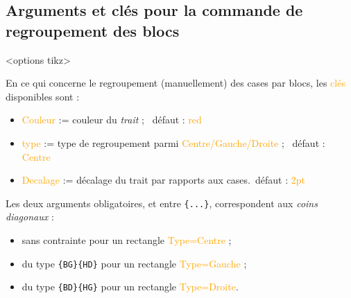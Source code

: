 \documentclass[french,a4paper,11pt]{article}
\newcommand\Cle[1]{{\small\sffamily\textlangle \textcolor{orange}{#1}\textrangle}}
\begin{document}
{{\begin{DemoCode}[]
\begin{TableKarnaugh}[Variables=k/l/m,StyleAlternatif]
\end{TableKarnaugh}
\end{DemoCode}

\pagebreak

\subsection{Arguments et clés pour la commande de regroupement des blocs}

\begin{DemoCode}
\begin{TableKarnaugh}[clés]<options tikz>
\end{TableKarnaugh}
\end{DemoCode}

\begin{tipblock}
En ce qui concerne le regroupement (manuellement) des cases par blocs, les \Cle{clés} disponibles sont :

\begin{itemize}
	\item \Cle{Couleur} := couleur du \textit{trait} ; \hfill~défaut : \Cle{red}
	\item \Cle{type} := type de regroupement parmi \Cle{Centre/Gauche/Droite} ; \hfill~défaut : \Cle{Centre}
	\item \Cle{Decalage} := décalage du trait par rapports aux cases.\hfill~défaut : \Cle{2pt}
\end{itemize}

Les deux arguments obligatoires, et entre \texttt{\{...\}}, correspondent aux \textit{coins diagonaux} :

\begin{itemize}
	\item sans contrainte pour un rectangle \Cle{Type=Centre} ;
	\item du type \texttt{\{BG\}\{HD\}} pour un rectangle \Cle{Type=Gauche} ;
	\item du type \texttt{\{BD\}\{HG\}} pour un rectangle \Cle{Type=Droite}.
\end{itemize}
\vspace*{-\baselineskip}\leavevmode
\end{tipblock}

}}
\end{document}
